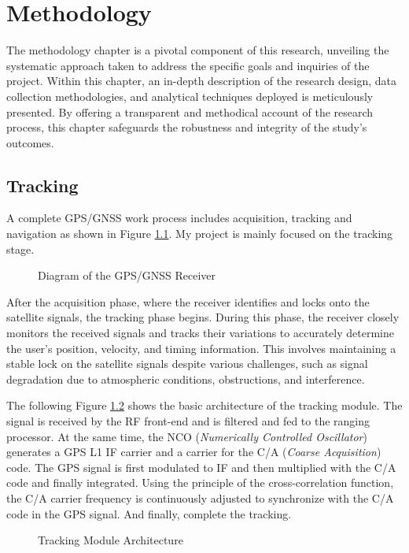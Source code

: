 \myClearDoublePage
\chapter{Methodology}
The methodology chapter is a pivotal component of this research, unveiling the systematic approach taken to address the specific goals and inquiries of the project. Within this chapter, an in-depth description of the research design, data collection methodologies, and analytical techniques deployed is meticulously presented. By offering a transparent and methodical account of the research process, this chapter safeguards the robustness and integrity of the study's outcomes.


\section{Tracking}
A complete GPS/GNSS work process includes acquisition, tracking and navigation as shown in Figure \ref{fig:receiver}. My project is mainly focused on the tracking stage.
\begin{figure}[!h]
    \centering
    
    \caption{Diagram of the GPS/GNSS Receiver}
    \label{fig:receiver}
\end{figure}

After the acquisition phase, where the receiver identifies and locks onto the satellite signals, the tracking phase begins. During this phase, the receiver closely monitors the received signals and tracks their variations to accurately determine the user's position, velocity, and timing information. This involves maintaining a stable lock on the satellite signals despite various challenges, such as signal degradation due to atmospheric conditions, obstructions, and interference.

The following Figure \ref{fig:tracking_digram} shows the basic architecture of the tracking module. The signal is received by the RF front-end and is filtered and fed to the ranging processor. At the same time, the NCO (\textit{Numerically Controlled Oscillator}) generates a GPS L1 IF carrier and a carrier for the C/A (\textit{Coarse Acquisition}) code. The GPS signal is first modulated to IF and then multiplied with the C/A code and finally integrated. Using the principle of the cross-correlation function, the C/A carrier frequency is continuously adjusted to synchronize with the C/A code in the GPS signal. And finally, complete the tracking\cite{RN151}.
\begin{figure}[!h]
    \centering
    
    \caption{Tracking Module Architecture}
    \label{fig:tracking_digram}
\end{figure}

